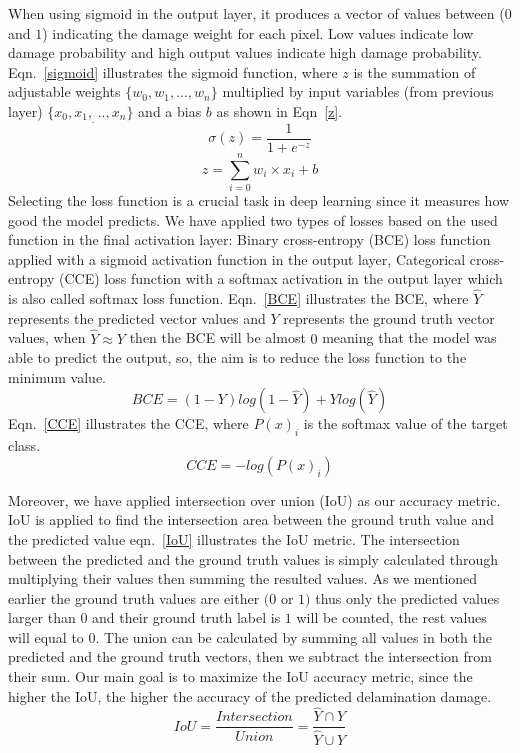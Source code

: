 \documentclass[preprint,9pt]{elsarticle}
\begin{document}
When using sigmoid in the output layer, it produces a vector of values between (\(0\) and \(1\)) indicating the damage weight for each pixel. 
Low values indicate low damage probability and high output values indicate high damage probability. Eqn.~\ref{sigmoid} illustrates the sigmoid function, 
where \(z\) is the summation of adjustable weights \(\{w_0,w_1,...,w_n \}\) multiplied by input variables (from previous layer) \(\{x_0,x_1,_...,x_n\}\) and a bias \(b\) as shown in Eqn~\ref{z}.
\begin{equation}
	\sigma(z) = \frac{1}{1+e^{-z}}
	\label{sigmoid}
\end{equation}
\begin{equation}
	z= \sum_{i=0}^{n}  w_i\times x_i +b
	\label{z}
\end{equation}
Selecting the loss function is a crucial task in deep learning since it measures how good the model predicts.
We have applied two types of losses based on the used function in the final activation layer: Binary cross-entropy (BCE) loss function applied with a sigmoid activation function in the output layer, Categorical cross-entropy (CCE) loss function with a softmax activation in the output layer which is also called softmax loss function.
Eqn.~\ref{BCE} illustrates the BCE, where \(\hat{Y}\) represents the predicted vector values and \(Y\) represents the ground truth vector values, when \(\hat{Y} \approx Y\) then the BCE will be almost \(0\) meaning that the model was able to predict the output, so, the aim is to reduce the loss function to the minimum value.
\begin{equation}
	BCE = (1-Y)log(1-\hat{Y})+Ylog(\hat{Y})
	\label{BCE}
\end{equation}
Eqn.~\ref{CCE} illustrates the CCE, where \( P(x)_{i}\) is the softmax value of the target class. 
\begin{equation}
CCE = -log\left( P(x)_{i} \right)
\label{CCE}
\end{equation}

Moreover, we have applied intersection over union (IoU) as our accuracy metric. 
IoU is applied to find the intersection area between the ground truth value and the predicted value eqn.~\ref{IoU} illustrates the IoU metric.
The intersection between the predicted and the ground truth values is simply calculated through multiplying their values then summing the resulted values.
As we mentioned earlier the ground truth values are either \((0\) or \(1)\) thus only the predicted values larger than \(0\) and their ground truth label is \(1\) will be counted, the rest values will equal to \(0\). 
The union can be calculated by summing all values in both the predicted and the ground truth  vectors, then we subtract the intersection from their sum.
Our main goal is to maximize the IoU accuracy metric, since the higher the IoU, the higher the accuracy of the predicted delamination damage.
\begin{equation}
IoU = \frac{Intersection}{Union} = \frac{\hat{Y} \cap Y}{\hat{Y} \cup Y} 
\label{IoU}
\end{equation}
\end{document}
